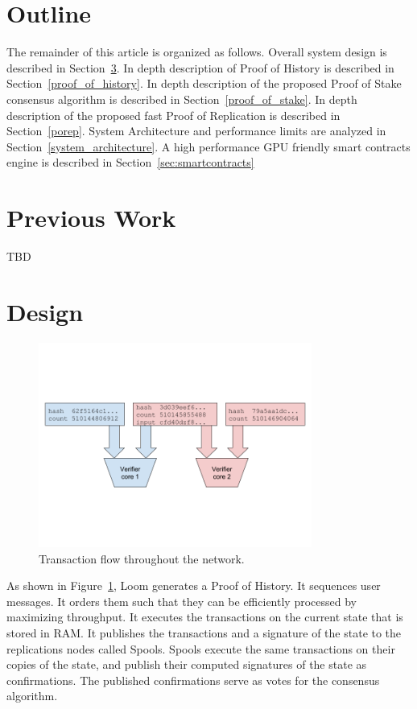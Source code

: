 \documentclass[12pt]{article}
\begin{document}
\section{Outline}
The remainder of this article is organized as follows. Overall system design is described in Section~\ref{design}. In depth description of Proof of History is described in Section~\ref{proof_of_history}. In depth description of the proposed Proof of Stake consensus algorithm is described in Section~\ref{proof_of_stake}. In depth description of the proposed fast Proof of Replication is described in Section~\ref{porep}. System Architecture and performance limits are analyzed in Section~\ref{system_architecture}. A high performance GPU friendly smart contracts engine is described in Section~\ref{sec:smartcontracts}

\section{Previous Work}\label{previous work}
TBD
\section{Design}\label{design}

\begin{figure}
  \begin{center}
    \centering
    \includegraphics[width=0.8\textwidth]{figures/fig_1.png}
    \caption[Fig 1]{Transaction flow throughout the network.\label{fig:design}}
  \end{center}
  \end{figure}

As shown in Figure~\ref{fig:design}, Loom generates a Proof of History. It sequences user messages. It orders them such that they can be efficiently processed by maximizing throughput.  It executes the transactions on the current state that is stored in RAM. It publishes the transactions and a signature of the state to the replications nodes called Spools. Spools execute the same transactions on their copies of the state, and publish their computed signatures of the state as confirmations. The published confirmations serve as votes for the consensus algorithm.
\end{document}
